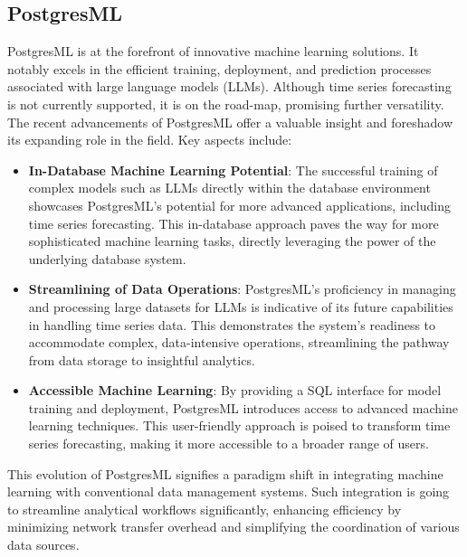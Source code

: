 \subsection{PostgresML}

PostgresML \cite{postgresml_website} is at the forefront of innovative machine learning solutions. It  notably excels in the efficient training, deployment, and prediction processes associated with large language models (LLMs). Although time series forecasting is not currently supported, it is on the road-map, promising further versatility. The recent advancements of PostgresML offer a valuable insight and foreshadow its expanding role in the field. Key aspects include:

\begin{itemize}
    \item \textbf{In-Database Machine Learning Potential}: The successful training of complex models such as LLMs directly within the database environment showcases PostgresML’s potential for more advanced applications, including time series forecasting. This in-database approach paves the way for more sophisticated machine learning tasks, directly leveraging the power of the underlying database system.
    \item \textbf{Streamlining of Data Operations}: PostgresML's proficiency in managing and processing large datasets for LLMs is indicative of its future capabilities in handling time series data. This demonstrates the system's readiness to accommodate complex, data-intensive operations, streamlining the pathway from data storage to insightful analytics.
    \item \textbf{Accessible Machine Learning}: By providing a SQL interface for model training and deployment, PostgresML introduces access to advanced machine learning techniques. This user-friendly approach is poised to transform time series forecasting, making it more accessible to a broader range of users.
\end{itemize}

This evolution of PostgresML signifies a paradigm shift in integrating machine learning with conventional data management systems. Such integration is going to streamline analytical workflows significantly, enhancing efficiency by minimizing network transfer overhead and simplifying the coordination of various data sources.


